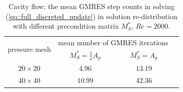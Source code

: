 \documentclass{eajam}
\begin{document}
       \begin{table}[!htbp]
         \centering
         \begin{tabular}{cccc}
           \toprule
           \multirow{2}{*}{pressure mesh}   & \multicolumn{2}{c}{mean
             number of GMRES iterations} \\
           \cline{2-3}
                           & $M_S^* = \frac{1}{\nu}A_p $& $M_S^* = A_p$ \\ \midrule
           $20 \times 20$  &      $4.96$           &     $13.19$
           \\ \midrule
           $40 \times 40$  &      $10.99$           &     $42.36$
           \\ \bottomrule 
         \end{tabular}
         \caption{Cavity flow: the mean GMRES step counts in solving
           (\ref{eq::full_discreted_update}) 
           in solution re-distribution with different precondition
           matrix $M_S^*$, $Re = 2000$.}
         \label{tab::GMRES_steps_update}
       \end{table}

      
      
 
\end{document}
